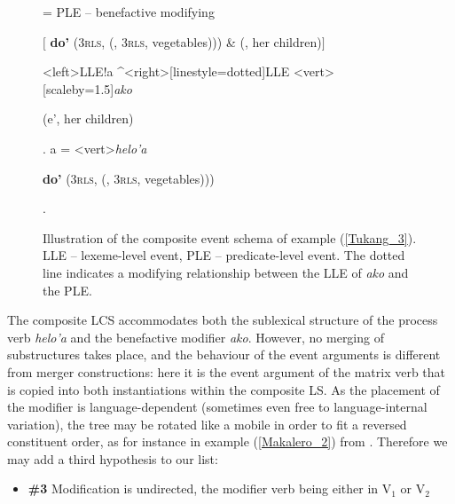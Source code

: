 \begin{figure}
\jtree[xunit=9.5em,yunit=2em]
\! = {PLE -- benefactive modifying}{\begin{scriptsize} $[$ \textbf{do'} (3\textsc{rls}, \textbf{} (, 3\textsc{rls}, vegetables))) \& (, her children)$]$\end{scriptsize}}
<left>{LLE}!a ^<right>[linestyle=dotted]{LLE}
<vert>[scaleby=1.5]{\textit{ako}}{\begin{scriptsize}  (e', her children)\end{scriptsize}}.
\!a = <vert>{\textit{helo'a}}
{\begin{scriptsize} \textbf{do'} (3\textsc{rls}, \textbf{} (, 3\textsc{rls}, vegetables)))\end{scriptsize}}.
\endjtree

\caption[Event schema illustration of example (\ref{Tukang_3})]{Illustration of the composite event schema of example (\ref{Tukang_3}). LLE -- lexeme-level event, PLE -- predicate-level event. The dotted line indicates a modifying relationship between the LLE of \textit{ako} and the PLE.}
\label{figure:eventschema_Maybrat97b}
\end{figure}

The composite LCS accommodates both the sublexical structure of the process verb \textit{helo'a} and the benefactive modifier \textit{ako}. However, no merging of substructures takes place, and the behaviour of the event arguments is different from merger constructions: here it is the event argument of the matrix verb that is copied into both instantiations within the composite LS. As the placement of the modifier is language-dependent (sometimes even free to language-internal variation), the tree may be rotated like a mobile in order to fit a reversed constituent order, as for instance in example (\ref{Makalero_2}) from . Therefore we may add a third hypothesis to our list:

\begin{itemize}
\item \textbf{\#3} Modification is undirected, the modifier verb being either in V$_1$ or V$_2$
\end{itemize}


